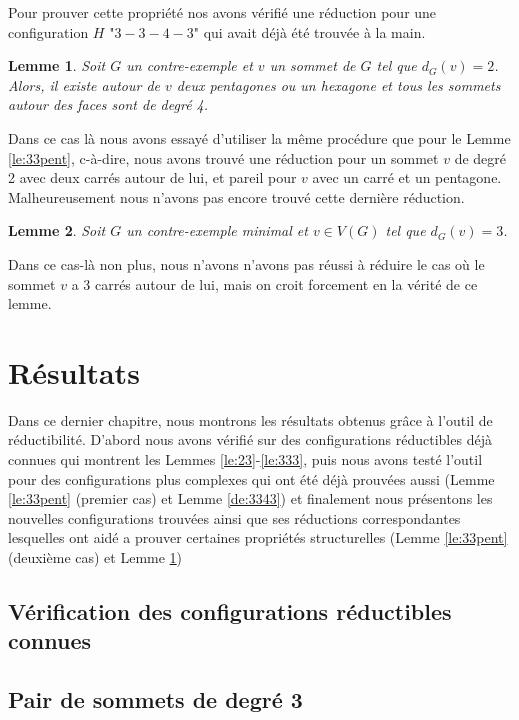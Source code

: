 \documentclass[10pt,a4paper]{article}
\newtheorem{lemme}{Lemme}
\begin{document}
Pour prouver cette propriété nos avons vérifié une réduction pour une configuration $H$ "$3-3-4-3$" qui avait déjà été trouvée à la main. 


\begin{lemme}
Soit $G$ un contre-exemple et $v$ un sommet de $G$ tel que $d_G(v) = 2$. Alors, il existe autour de $v$ deux pentagones ou un hexagone et tous les sommets autour des faces sont de degré 4.
\label{le:2pent}
\end{lemme}

Dans ce cas là nous avons essayé d'utiliser la même procédure que pour le Lemme \ref{le:33pent}, c-à-dire, nous avons trouvé une réduction pour un sommet $v$ de degré 2 avec deux carrés autour de lui, et pareil pour $v$ avec un carré et un pentagone. Malheureusement nous n'avons pas encore trouvé cette dernière réduction.

\begin{lemme}
Soit $G$ un contre-exemple minimal et $v \in V(G)$ tel que $d_G(v) = 3$.
\label{le:3}
\end{lemme}

Dans ce cas-là non plus, nous n'avons  n'avons pas réussi à réduire le cas où le sommet $v$ a 3 carrés autour de lui, mais on croit forcement en la vérité de ce lemme.

\section{Résultats}
\label{chap:res}

Dans ce dernier chapitre, nous montrons les résultats obtenus grâce à l'outil de réductibilité. D'abord nous avons vérifié sur des configurations réductibles déjà connues qui montrent les Lemmes \ref{le:23}-\ref{le:333}, puis nous avons testé l'outil pour des configurations plus complexes qui ont été déjà prouvées aussi (Lemme \ref{le:33pent} (premier cas) et Lemme \ref{de:3343}) et finalement nous présentons les nouvelles configurations trouvées ainsi que ses réductions correspondantes lesquelles ont aidé a prouver certaines propriétés structurelles (Lemme \ref{le:33pent} (deuxième cas) et Lemme \ref{le:2pent})  

\subsection{Vérification des configurations réductibles connues}
\subsection{Pair de sommets de degré 3}
\end{document}
